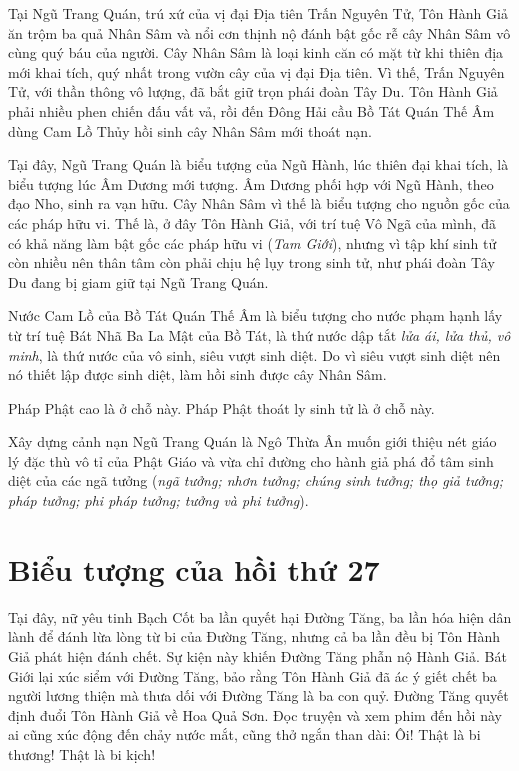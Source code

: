 Tại Ngũ Trang Quán, trú xứ của vị đại Địa tiên Trấn Nguyên Tử, Tôn Hành Giả ăn trộm ba quả Nhân Sâm và nổi cơn thịnh nộ đánh bật gốc rễ cây Nhân Sâm vô cùng quý báu của người. Cây Nhân Sâm là loại kinh căn có mặt từ khi thiên địa mới khai tích, quý nhất trong vườn cây của vị đại Địa tiên. Vì thế, Trấn Nguyên Tử, với thần thông vô lượng, đã bắt giữ trọn phái đoàn Tây Du. Tôn Hành Giả phải nhiều phen chiến đấu vất vả, rồi đến Đông Hải cầu Bồ Tát Quán Thế Âm dùng Cam Lồ Thủy hồi sinh cây Nhân Sâm mới thoát nạn.

Tại đây, Ngũ Trang Quán là biểu tượng của Ngũ Hành, lúc thiên đại khai tích, là biểu tượng lúc Âm Dương mới tượng. Âm Dương phối hợp với Ngũ Hành, theo đạo Nho, sinh ra vạn hữu. Cây Nhân Sâm vì thế là biểu tượng cho nguồn gốc của các pháp hữu vi. Thế là, ở đây Tôn Hành Giả, với trí tuệ Vô Ngã của mình, đã có khả năng làm bật gốc các pháp hữu vi (\emph{Tam Giới}), nhưng vì tập khí sinh tử còn nhiều nên thân tâm còn phải chịu hệ lụy trong sinh tử, như phái đoàn Tây Du đang bị giam giữ tại Ngũ Trang Quán.

Nước Cam Lồ của Bồ Tát Quán Thế Âm là biểu tượng cho nước phạm hạnh lấy từ trí tuệ Bát Nhã Ba La Mật của Bồ Tát, là thứ nước dập tắt \emph{lửa ái, lửa thủ, vô minh}, là thứ nước của vô sinh, siêu vượt sinh diệt. Do vì siêu vượt sinh diệt nên nó thiết lập được sinh diệt, làm hồi sinh được cây Nhân Sâm.

Pháp Phật cao là ở chỗ này. Pháp Phật thoát ly sinh tử là ở chỗ này.

Xây dựng cảnh nạn Ngũ Trang Quán là Ngô Thừa Ân muốn giới thiệu nét giáo lý đặc thù vô tỉ của Phật Giáo và vừa chỉ đường cho hành giả phá đổ tâm sinh diệt của các ngã tưởng (\emph{ngã tưởng; nhơn tưởng; chúng sinh tưởng; thọ giả tưởng; pháp tưởng; phi pháp tưởng; tưởng và phi tưởng}).

\section{Biểu tượng của hồi thứ 27} %
\label{sec:bieu_tuong_cua_hoi_thu_27}

Tại đây, nữ yêu tinh Bạch Cốt ba lần quyết hại Đường Tăng, ba lần hóa hiện dân lành để đánh lừa lòng từ bi của Đường Tăng, nhưng cả ba lần đều bị Tôn Hành Giả phát hiện đánh chết. Sự kiện này khiến Đường Tăng phẫn nộ Hành Giả. Bát Giới lại xúc siểm với Đường Tăng, bảo rằng Tôn Hành Giả đã ác ý giết chết ba người lương thiện mà thưa dối với Đường Tăng là ba con quỷ. Đường Tăng quyết định đuổi Tôn Hành Giả về Hoa Quả Sơn. Đọc truyện và xem phim đến hồi này ai cũng xúc động đến chảy nước mắt, cũng thở ngắn than dài: Ôi! Thật là bi thương! Thật là bi kịch!

